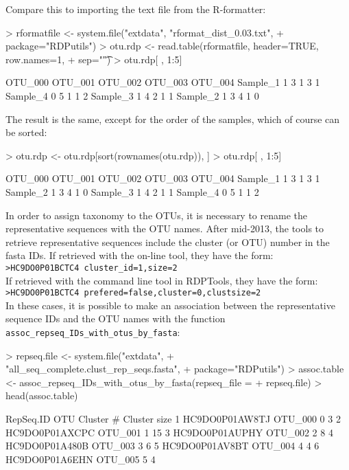 \documentclass{article}
\begin{document}
Compare this to importing the text file from the R-formatter:
\begin{Schunk}
\begin{Sinput}
> rformatfile <- system.file("extdata", "rformat_dist_0.03.txt", 
+                            package="RDPutils")
> otu.rdp <- read.table(rformatfile, header=TRUE, row.names=1, 
+                       sep="\t")
> otu.rdp[ , 1:5]
\end{Sinput}
\begin{Soutput}
         OTU_000 OTU_001 OTU_002 OTU_003 OTU_004
Sample_1       1       3       1       3       1
Sample_4       0       5       1       1       2
Sample_3       1       4       2       1       1
Sample_2       1       3       4       1       0
\end{Soutput}
\end{Schunk}
The result is the same, except for the order of the samples, which of course can be sorted:
\begin{Schunk}
\begin{Sinput}
> otu.rdp <- otu.rdp[sort(rownames(otu.rdp)), ]
> otu.rdp[ , 1:5]
\end{Sinput}
\begin{Soutput}
         OTU_000 OTU_001 OTU_002 OTU_003 OTU_004
Sample_1       1       3       1       3       1
Sample_2       1       3       4       1       0
Sample_3       1       4       2       1       1
Sample_4       0       5       1       1       2
\end{Soutput}
\end{Schunk}
In order to assign taxonomy to the OTUs, it is necessary to rename the representative sequences with the OTU names.  After mid-2013, the tools to retrieve representative sequences include the cluster (or OTU) number in the fasta IDs.
If retrieved with the on-line tool, they have the form:\\
\texttt{>HC9DO0P01BCTC4 cluster\_id=1,size=2}\\
If retrieved with the command line tool in RDPTools, they have the form:\\
\texttt{>HC9DO0P01BCTC4 prefered=false,cluster=0,clustsize=2}\\
In these cases, it is possible to make an association between the representative sequence IDs and the OTU names with the function \texttt{assoc\_repseq\_IDs\_with\_otus\_by\_fasta}:
\begin{Schunk}
\begin{Sinput}
> repseq.file <- system.file("extdata", 
+                "all_seq_complete.clust_rep_seqs.fasta", 
+                 package="RDPutils")
> assoc.table <- assoc_repseq_IDs_with_otus_by_fasta(repseq_file = 
+                                                      repseq.file)
> head(assoc.table)
\end{Sinput}
\begin{Soutput}
       RepSeq.ID     OTU Cluster # Cluster size
1 HC9DO0P01AW8TJ OTU_000         0            3
2 HC9DO0P01AXCPC OTU_001         1           15
3 HC9DO0P01AUPHY OTU_002         2            8
4 HC9DO0P01A480B OTU_003         3            6
5 HC9DO0P01AV8BT OTU_004         4            4
6 HC9DO0P01A6EHN OTU_005         5            4
\end{Soutput}
\end{Schunk}
\end{document}
